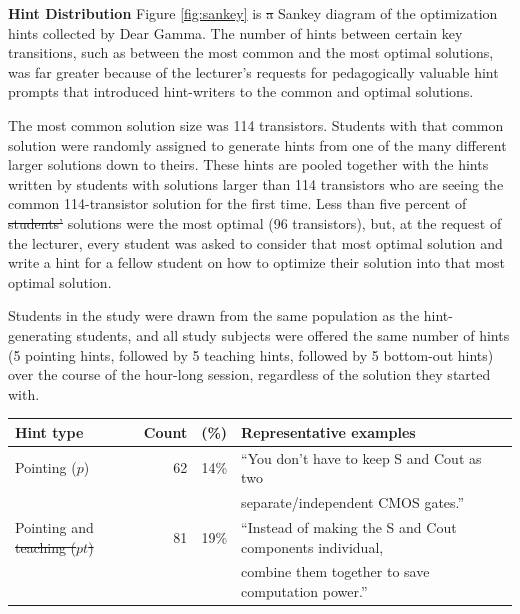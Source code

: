 \documentclass[12pt,twoside]{mitthesis}
\providecommand{\DIFaddtex}[1]{{\protect\color{blue}\uwave{#1}}} %
\providecommand{\DIFdeltex}[1]{{\protect\color{red}\sout{#1}}}                      %
\providecommand{\DIFaddbegin}{} %
\providecommand{\DIFaddend}{} %
\providecommand{\DIFdelbegin}{} %
\providecommand{\DIFdelend}{} %
\providecommand{\DIFaddFL}[1]{\DIFadd{#1}} %
\providecommand{\DIFdelFL}[1]{\DIFdel{#1}} %
\providecommand{\DIFaddbeginFL}{} %
\providecommand{\DIFaddendFL}{} %
\providecommand{\DIFdelbeginFL}{} %
\providecommand{\DIFdelendFL}{} %
\providecommand{\DIFadd}[1]{\texorpdfstring{\DIFaddtex{#1}}{#1}} %
\providecommand{\DIFdel}[1]{\texorpdfstring{\DIFdeltex{#1}}{}} %
\begin{document}
{{{{{{{{{{{\bf Hint Distribution} Figure \ref{fig:sankey} is \DIFdelbegin \DIFdel{a }\DIFdelend \DIFaddbegin \DIFadd{the }\DIFaddend Sankey diagram of the optimization hints collected by Dear Gamma. The number of hints between certain key transitions, such as between the most common and the most optimal solutions, was far greater because of the lecturer's requests for pedagogically valuable hint prompts that introduced hint-writers to the common and optimal solutions. 

The most common solution size was 114 transistors. Students with that common solution were randomly assigned to generate hints from one of the many different larger solutions down to theirs. These hints are pooled together with the hints written by students with solutions larger than 114 transistors who are seeing the common 114-transistor solution for the first time. Less than five percent of \DIFdelbegin \DIFdel{students' }\DIFdelend \DIFaddbegin \DIFadd{student }\DIFaddend solutions were the most optimal (96 transistors), but, at the request of the lecturer, every student was asked to consider that most optimal solution and write a hint for a fellow student on how to optimize their solution into that most optimal solution.

Students in the study were drawn from the same population as the hint-generating students, and all study subjects were offered the same number of hints (5 pointing hints, followed by 5 teaching hints, followed by 5 bottom-out hints) over the course of the hour-long session, regardless of the solution they started with. 

\begin{table}[t]
\DIFaddbeginFL \footnotesize
  \DIFaddendFL \begin{center}
    \begin{tabular}{|l|r|r|l|}
\hline
      {\bf Hint type} & {\bf Count} & {\bf (\%)} & {\bf Representative examples} \\
\hline
      Pointing ($p$) & 62 & 14\% & ``You don't have to keep S and Cout as two  \DIFaddbeginFL \\
       & & & \DIFaddendFL separate/independent CMOS gates.'' \\
      \hline
      Pointing and  \DIFdelbeginFL \DIFdelFL{teaching ($pt$) }\DIFdelendFL & 81 & 19\% & ``Instead of making the S and Cout components individual, \\
\DIFaddbeginFL \DIFaddFL{teaching ($pt$) }\DIFaddendFL & & & combine them together to save computation power.'' \\
\DIFaddbeginFL 


\end{tabular}
\end{center}
\end{table}}}}}}}}}}}
\end{document}
